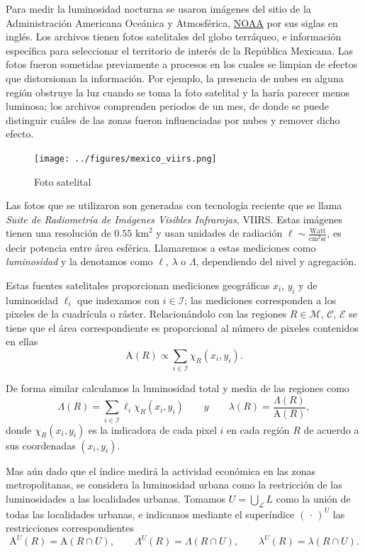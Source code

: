 \documentclass[]{article}
\begin{document}
Para medir la luminosidad nocturna se usaron imágenes del sitio de la
Administración Americana Oceánica y Atmosférica,
\href{http://ngdc.noaa.gov/eog/download.html}{NOAA} por sus siglas en
inglés. Los archivos tienen fotos satelitales del globo terráqueo, e
información específica para seleccionar el territorio de interés de la
República Mexicana. Las fotos fueron sometidas previamente a procesos en
los cuales se limpian de efectos que distorsionan la información. Por
ejemplo, la presencia de nubes en alguna región obstruye la luz cuando
se toma la foto satelital y la haría parecer menos luminosa; los
archivos comprenden periodos de un mes, de donde se puede distinguir
cuáles de las zonas fueron influenciadas por nubes y remover dicho
efecto.

\begin{figure}[htbp]
\centering
\texttt{[image: ../figures/mexico\_viirs.png]}
\caption{Foto satelital}
\end{figure}

Las fotos que se utilizaron son generadas con tecnología reciente que se
llama \emph{Suite de Radiometría de Imágenes Visibles Infrarojas},
VIIRS. Estas imágenes tienen una resolución de \(\text{0.55 km}^2\) y
usan unidades de radiación
\(\ell \sim \frac{\text{Watt}}{\text{cm}^2 \text{sr}}\), es decir
potencia entre área esférica. Llamaremos a estas mediciones como
\emph{luminosidad} y la denotamos como \(\ell\), \(\lambda\) o
\(\Lambda\), dependiendo del nivel y agregación.

Estas fuentes satelitales proporcionan mediciones geográficas
\(x_i,\, y_i\) y de luminosidad \(\ell_i\) que indexamos con
\(i \in \mathcal{I}\); las mediciones corresponden a los pixeles de la
cuadrícula o ráster. Relacionándolo con las regiones
\(R \in \mathcal{M},\, \mathcal{C},\, \mathcal{E}\) se tiene que el área
correspondiente es proporcional al número de pixeles contenidos en ellas
\[ \mathrm{A}(R) \propto \sum\limits_{i \in \mathcal{I}} \chi_R(x_i,y_i).\]

De forma similar calculamos la luminosidad total y media de las regiones
como
\[ \Lambda(R) = \sum\limits_{i \in \mathcal{I}} \ell_i \chi_R(x_i,y_i) \qquad y
      \qquad \lambda(R) = \frac{\Lambda(R)}{\mathrm{A}(R)}, \] donde
\(\chi_R(x_i,y_i)\) es la indicadora de cada pixel \(i\) en cada región
\(R\) de acuerdo a sus coordenadas \((x_i, y_i)\).

Mas aún dado que el índice medirá la actividad económica en las zonas
metropolitanas, se considera la luminosidad urbana como la restricción
de las luminosidades a las localidades urbanas. Tomamos
\(U = \bigcup_\mathcal{L}L\) como la unión de todas las localidades
urbanas, e indicamos mediante el superíndice \((\,\cdot\,)^U\) las
restricciones correspondientes
\[ \mathrm{A}^U(R) = \mathrm{A}(R \cap U), \qquad 
      \Lambda^U(R) = \Lambda(R \cap U), \qquad 
      \lambda^U(R) = \lambda(R \cap U). \]
\end{document}

